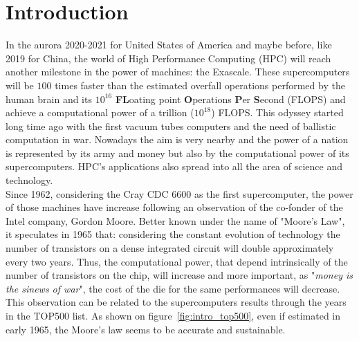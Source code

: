 \chapter*{Introduction}

In the aurora 2020-2021 for United States of America and maybe before, like 2019 for China, the world of High Performance Computing (HPC) will reach another milestone in the power of machines: the Exascale. 
These supercomputers will be $100$ times faster than the estimated overfall operations performed by the human brain and its $10^{16}$ \textbf{FL}oating point \textbf{O}perations \textbf{P}er \textbf{S}econd (FLOPS) and achieve a computational power of a trillion ($10^{18}$) FLOPS.
This odyssey started long time ago with the first vacuum tubes computers and the need of ballistic computation in war. 
Nowadays the aim is very nearby and the power of a nation is represented by its army and money but also by the computational power of its supercomputers.
HPC's applications also spread into all the area of science and technology.\\

Since 1962, considering the Cray CDC 6600 as the first supercomputer, the power of those machines have increase following an observation of the co-fonder of the Intel company, Gordon Moore. 
Better known under the name of "Moore's Law", it speculates in 1965 that: considering the constant evolution of technology the number of transistors on a dense integrated circuit will double approximately every two years. 
Thus, the computational power, that depend intrinsically of the number of transistors on the chip, will increase and more important, as "\textit{money is the sinews of war}", the cost of the die for the same performances will decrease.  
This observation can be related to the supercomputers results through the years in the TOP500 list. 
As shown on figure~\ref{fig:intro_top500}, even if estimated in early 1965, the Moore's law seems to be accurate and sustainable. 

